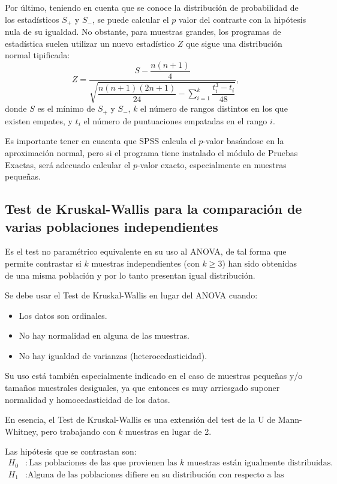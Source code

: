 \begin{description}
Por último, teniendo en cuenta que se conoce la distribución de probabilidad de los estadísticos $S_+$ y $S_-$, se puede calcular el $p$ valor del contraste con la hipótesis nula de su igualdad. No obstante, para muestras grandes, los programas de estadística suelen utilizar un nuevo estadístico $Z$ que sigue una distribución normal tipificada:
\[
Z = \frac{S-\dfrac{n(n+1)}{4}}{\sqrt{\dfrac{n(n+1)(2n+1)}{24}-\sum_{i=1}^k\dfrac{t_i^3-t_i}{48}}},
\]
donde $S$ es el mínimo de $S_+$ y $S_-$, $k$ el número de rangos distintos en los que existen empates, y $t_i$ el número de puntuaciones empatadas en el rango $i$.

Es importante tener en cuaenta que SPSS calcula el $p$-valor basándose en la aproximación normal, pero si el programa tiene instalado el módulo de Pruebas Exactas, será adecuado calcular el $p$-valor exacto, especialmente en muestras pequeñas.


\subsection{Test de Kruskal-Wallis para la comparación de varias poblaciones independientes}
Es el test no paramétrico equivalente en su uso al ANOVA, de tal forma que permite contrastar si $k$ muestras independientes (con $k\geq3$) han sido obtenidas de una misma población y por lo tanto presentan igual distribución.

Se debe usar el Test de Kruskal-Wallis en lugar del ANOVA cuando:
\begin{itemize}
\item Los datos son ordinales.
\item No hay normalidad en alguna de las muestras.
\item No hay igualdad de varianzas (heterocedasticidad).
\end{itemize}

Su uso está también especialmente indicado en el caso de muestras pequeñas y/o tamaños muestrales desiguales, ya que entonces es muy arriesgado suponer normalidad y homocedasticidad de los datos.

En esencia, el Test de Kruskal-Wallis es una extensión del test de la U de Mann-Whitney, pero trabajando con $k$ muestras en lugar de 2.

Las hipótesis que se contrastan son:
\begin{align*}
H_0 &: \textrm{Las poblaciones de las que provienen las $k$ muestras están igualmente distribuidas.}\\
H_1 &: \textrm{Alguna de las poblaciones difiere en su distribución con respecto a las demás.}
\end{align*}


\end{description}
